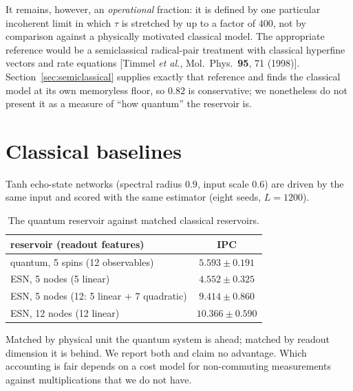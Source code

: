 \documentclass[aps,prx,reprint,superscriptaddress,nofootinbib,floatfix]{revtex4-2}
\begin{document}
It remains, however, an \emph{operational} fraction: it is defined by one
particular incoherent limit in which $\tau$ is stretched by up to a factor of
$400$, not by comparison against a physically motivated classical model. The
appropriate reference would be a semiclassical radical-pair treatment with
classical hyperfine vectors and rate equations [Timmel \textit{et al.},
Mol.~Phys.\ \textbf{95}, 71 (1998)]. Section~\ref{sec:semiclassical} supplies
exactly that reference and finds the classical model at its own memoryless floor,
so $0.82$ is conservative; we nonetheless do not present it as a measure of ``how
quantum'' the reservoir is.

\section{Classical baselines}
\label{sec:esn}
Tanh echo-state networks (spectral radius $0.9$, input scale $0.6$) are driven by the
same input and scored with the same estimator (eight seeds, $L=1200$).

\begin{table}[H]
\caption{\label{tab:esn}The quantum reservoir against matched classical reservoirs.}
\begin{ruledtabular}
\begin{tabular}{lc}
reservoir (readout features) & IPC \\
\hline
quantum, 5 spins (12 observables) & $5.593\pm0.191$ \\
ESN, 5 nodes (5 linear) & $4.552\pm0.325$ \\
ESN, 5 nodes (12: 5 linear $+$ 7 quadratic) & $9.414\pm0.860$ \\
ESN, 12 nodes (12 linear) & $10.366\pm0.590$ \\
\end{tabular}
\end{ruledtabular}
\end{table}

Matched by physical unit the quantum system is ahead; matched by readout dimension it
is behind. We report both and claim no advantage. Which accounting is fair depends on
a cost model for non-commuting measurements against multiplications that we do not
have.
\end{document}
